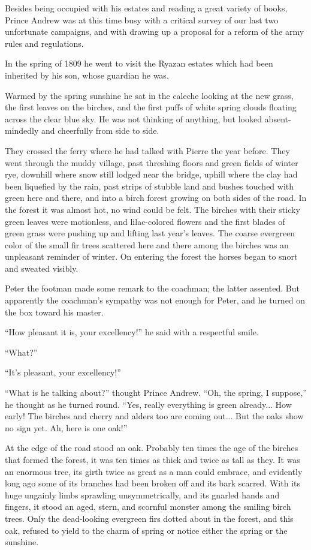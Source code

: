 Besides being occupied with his estates and reading a great
variety of books, Prince Andrew was at this time busy with a
critical survey of our last two unfortunate campaigns, and with
drawing up a proposal for a reform of the army rules and
regulations.

In the spring of 1809 he went to visit the Ryazan estates which
had been inherited by his son, whose guardian he was.

Warmed by the spring sunshine he sat in the caleche looking at
the new grass, the first leaves on the birches, and the first
puffs of white spring clouds floating across the clear blue
sky. He was not thinking of anything, but looked absent-mindedly
and cheerfully from side to side.

They crossed the ferry where he had talked with Pierre the year
before.  They went through the muddy village, past threshing
floors and green fields of winter rye, downhill where snow still
lodged near the bridge, uphill where the clay had been liquefied
by the rain, past strips of stubble land and bushes touched with
green here and there, and into a birch forest growing on both
sides of the road. In the forest it was almost hot, no wind could
be felt. The birches with their sticky green leaves were
motionless, and lilac-colored flowers and the first blades of
green grass were pushing up and lifting last year's leaves. The
coarse evergreen color of the small fir trees scattered here and
there among the birches was an unpleasant reminder of winter. On
entering the forest the horses began to snort and sweated
visibly.

Peter the footman made some remark to the coachman; the latter
assented.  But apparently the coachman's sympathy was not enough
for Peter, and he turned on the box toward his master.

``How pleasant it is, your excellency!'' he said with a
respectful smile.

``What?''

``It's pleasant, your excellency!''

``What is he talking about?'' thought Prince Andrew. ``Oh, the
spring, I suppose,'' he thought as he turned round. ``Yes, really
everything is green already... How early! The birches and cherry
and alders too are coming out... But the oaks show no sign
yet. Ah, here is one oak!''

At the edge of the road stood an oak. Probably ten times the age
of the birches that formed the forest, it was ten times as thick
and twice as tall as they. It was an enormous tree, its girth
twice as great as a man could embrace, and evidently long ago
some of its branches had been broken off and its bark
scarred. With its huge ungainly limbs sprawling unsymmetrically,
and its gnarled hands and fingers, it stood an aged, stern, and
scornful monster among the smiling birch trees. Only the
dead-looking evergreen firs dotted about in the forest, and this
oak, refused to yield to the charm of spring or notice either the
spring or the sunshine.

